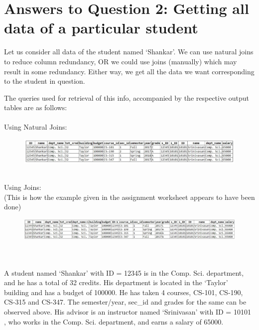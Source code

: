 \documentclass{article}
\begin{document}
\section{Answers to Question 2: Getting all data of a particular student}
Let us consider all data of the student named `Shankar'. We can use natural joins to reduce column redundancy, OR we could use joins (manually) which may result in some redundancy. Either way, we get all the data we want corresponding to the student in question.

The queries used for retrieval of this info, accompanied by the respective output tables are as follows:
\\ \\
Using Natural Joins: \\
{
}
\begin{figure}[hbt]
    \centering
    \includegraphics[scale=0.75]{q2query1op.jpg}
    \label{fig:my_label1}
\end{figure}

\\ \vspace{0.5cm}
{\noindent Using Joins:}\\(This is how the example given in the assignment worksheet appears to have been done)
\\
{
}
\begin{figure}[hbt]
    \centering
    \includegraphics[scale=0.68]{q2query2op.jpg}
    \label{fig:my_label1}
\end{figure}
\\
\\

A student named `Shankar' with ID = 12345 is in the Comp. Sci. department, and he has a total of 32 credits. His department is located in the `Taylor' building and has a budget of 100000. He has taken 4 courses, CS-101, CS-190, CS-315 and CS-347. The semester/year, sec\_id and grades for the same can be observed above. His advisor is an instructor named `Srinivasan' with ID = 10101 , who works in the Comp. Sci. department, and earns a salary of 65000.
\end{document}
